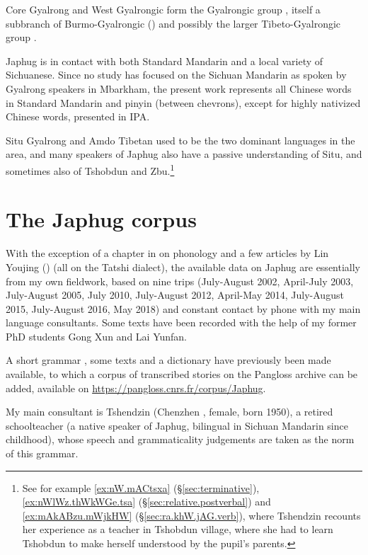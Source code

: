 Core Gyalrong and West Gyalrongic form the Gyalrongic group \citep{jackson00puxi}, itself a subbranch of Burmo-Gyalrongic (\citealt{jacques.michaud11naish}) and possibly  the larger Tibeto-Gyalrongic group \citep{Sagart19ST}.

Japhug is in contact with both Standard Mandarin and a local variety of Sichuanese. Since no study has focused on the Sichuan Mandarin as spoken by Gyalrong speakers in Mbarkham, the present work represents all Chinese words in Standard Mandarin and pinyin (between chevrons), except for highly nativized Chinese words, presented in IPA.

Situ Gyalrong and Amdo Tibetan used to be the two dominant languages in the area, and many speakers of Japhug also have a passive understanding of Situ, and sometimes also of Tshobdun and Zbu.\footnote{See for example \ref{ex:nW.mACtsxa} (§\ref{sec:terminative}), \ref{ex:nWlWz.thWkWGe.tsa} (§\ref{sec:relative.postverbal}) and \ref{ex:mAkABzu.mWjkHW} (§\ref{sec:ra.khW.jAG.verb}), where Tshendzin recounts her experience as a teacher in Tshobdun village, where she had to learn Tshobdun to make herself understood by the pupil's parents. }


 
 \section{The Japhug corpus}
With the exception of a chapter in \citet[468--486]{linxr93jiarong} on phonology and a few articles by Lin Youjing (\citealt{linluo03, lin11direction}) (all on the Tatshi dialect), the available data on Japhug
are essentially from my own fieldwork, based on nine trips (July-August 2002, April-July 2003, July-August 2005, July 2010, July-August 2012, April-May 2014, July-August 2015, July-August 2016, May 2018) and constant contact by phone with my main language consultants. Some texts have been recorded with the help of my former PhD students Gong Xun and Lai Yunfan.
 
A short grammar \citep{jacques08}, some texts \citep{jacques10gesar} and a dictionary \citep{jacques15japhug} have previously been made available, to which a corpus of transcribed stories on the  Pangloss archive \citep{michailovsky14pangloss, michaud16auco} can be added, available on \url{https://pangloss.cnrs.fr/corpus/Japhug}.


My main consultant is Tshendzin (Chenzhen , female, born 1950), a retired schoolteacher (a native speaker of Japhug, bilingual in Sichuan Mandarin since childhood), whose speech and grammaticality judgements are taken as the norm of this grammar. 

